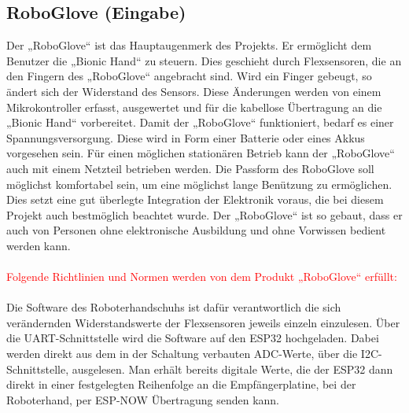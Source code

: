 \documentclass[11pt]{article}
\begin{document}
\subsection{RoboGlove (Eingabe)}
Der „RoboGlove“ ist das Hauptaugenmerk des Projekts. Er ermöglicht dem Benutzer die „Bionic Hand“ zu steuern. 
Dies geschieht durch Flexsensoren, die an den Fingern des „RoboGlove“ angebracht sind. Wird ein Finger gebeugt, 
so ändert sich der Widerstand des Sensors. Diese Änderungen werden von einem Mikrokontroller erfasst, ausgewertet 
und für die kabellose Übertragung an die „Bionic Hand“ vorbereitet. Damit der „RoboGlove“ funktioniert, bedarf es 
einer Spannungsversorgung. Diese wird in Form einer Batterie oder eines Akkus vorgesehen sein. Für einen möglichen 
stationären Betrieb kann der „RoboGlove“ auch mit einem Netzteil betrieben werden. Die Passform des RoboGlove soll 
möglichst komfortabel sein, um eine möglichst lange Benützung zu ermöglichen. Dies setzt eine gut überlegte Integration 
der Elektronik voraus, die bei diesem Projekt auch bestmöglich beachtet wurde. Der „RoboGlove“ ist so gebaut, dass er 
auch von Personen ohne elektronische Ausbildung und ohne Vorwissen bedient werden kann.\\
\\
\textcolor{red}{Folgende Richtlinien und Normen werden von dem Produkt „RoboGlove“ erfüllt:}\\
\\
Die Software des Roboterhandschuhs ist dafür verantwortlich die sich verändernden Widerstandswerte der Flexsensoren 
jeweils einzeln einzulesen. Über die UART-Schnittstelle wird die Software auf den ESP32 hochgeladen. Dabei werden 
direkt aus dem in der Schaltung verbauten ADC-Werte, über die I2C-Schnittstelle, ausgelesen. Man erhält bereits digitale 
Werte, die der ESP32 dann direkt in einer festgelegten Reihenfolge an die Empfängerplatine, bei der Roboterhand, per 
ESP-NOW Übertragung senden kann.
\end{document}
